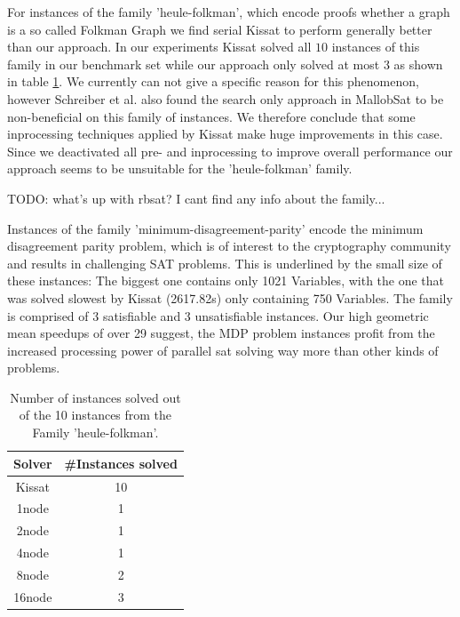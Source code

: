 \documentclass[12pt,a4paper,twoside]{scrartcl}
\numberwithin{equation}{section}
\begin{document}
For instances of the family 'heule-folkman', which encode proofs whether a graph is a so called Folkman Graph \cite{satComp2024} we find serial Kissat to perform generally better than our approach. In our experiments Kissat solved all $10$ instances of this family in our benchmark set while our approach only solved at most $3$ as shown in table \ref{tab:heuleFolkman}. We currently can not give a specific reason for this phenomenon, however Schreiber et al. \cite{searchOnlyPaper} also found the search only approach in MallobSat to be non-beneficial on this family of instances. We therefore conclude that some inprocessing techniques applied by Kissat make huge improvements in this case. Since we deactivated all pre- and inprocessing to improve overall performance our approach seems to be unsuitable for the 'heule-folkman' family.

TODO: what's up with rbsat? I cant find any info about the family...

Instances of the family 'minimum-disagreement-parity' \cite{satComp2022} encode the minimum disagreement parity problem, which is of interest to the cryptography community and results in challenging SAT problems. This is underlined by the small size of these instances: The biggest one contains only 1021 Variables, with the one that was solved slowest by Kissat (2617.82s) only containing 750 Variables. The family is comprised of 3 satisfiable and 3 unsatisfiable instances. Our high geometric mean speedups of over 29 suggest, the MDP problem instances profit from the increased processing power of parallel sat solving way more than other kinds of problems.

\begin{table}
  \center
  \begin{tabular}{ cc }
    \toprule
    Solver  & \#Instances solved\\
    \midrule
    Kissat  & 10\\
    1node   & 1\\
    2node   & 1\\
    4node   & 1\\
    8node   & 2\\
    16node  & 3\\
    \bottomrule
  \end{tabular}
  \caption{Number of instances solved out of the 10 instances from the Family 'heule-folkman'.}
  \label{tab:heuleFolkman}
\end{table}
\end{document}
